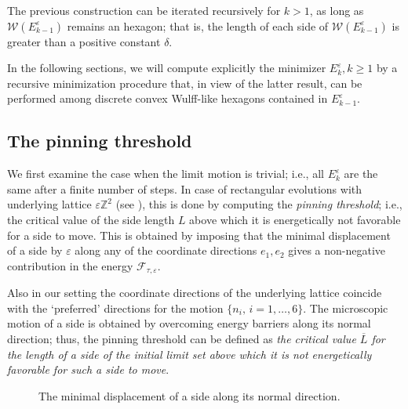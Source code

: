 \documentclass{interact}
\numberwithin{equation}{section}
\theoremstyle{definition}
\renewcommand{\epsilon}{\varepsilon}
\def\e{\epsilon}
\begin{document}
The previous construction can be iterated recursively for $k>1$, as long as $\mathcal{W}(E_{k-1}^\epsilon)$ remains an hexagon; that is, the length of each side of $\mathcal{W}(E_{k-1}^\epsilon)$ is greater than a positive constant $\delta$.
\endproof

In the following sections, we will compute explicitly the minimizer $E^\epsilon_k, k\geq1$ by a recursive minimization procedure that, in view of the latter result, can be performed among discrete convex Wulff-like hexagons contained in $E^\epsilon_{k-1}$.

\subsection{The pinning threshold}\label{pinning}

We first examine the case when the limit motion is trivial; i.e., all $E^\e_k$ are the same after a finite number of steps.
In case of rectangular evolutions with underlying lattice $\varepsilon\mathbb{Z}^2$ (see \cite{BGN, BraSci}), this is done by computing the {\em pinning threshold}; i.e., the critical value of the side length $L$ above which it is energetically not favorable for a side to move. This is obtained by imposing that the minimal displacement of a side by $\epsilon$ along any of the coordinate directions $e_1, e_2$ gives a non-negative contribution in the energy $\mathcal{F}_{\tau,\varepsilon}$. 

Also in our setting the coordinate directions of the underlying lattice coincide with the `preferred' directions for the motion $\{n_i,\,i=1,\dots,6\}$. 
The microscopic motion of a side is obtained by overcoming energy barriers along its normal direction; thus, the pinning threshold can be defined as \emph{the critical value $\overline{L}$ for the length of a side of the initial limit set above which it is not energetically favorable for such a side to move}.\\
\begin{figure}[htbp]
\centering
\def\svgwidth{190pt}

\caption{The minimal displacement of a side along its normal direction.}
\label{fig:pinning}
\end{figure} 
\end{document}
